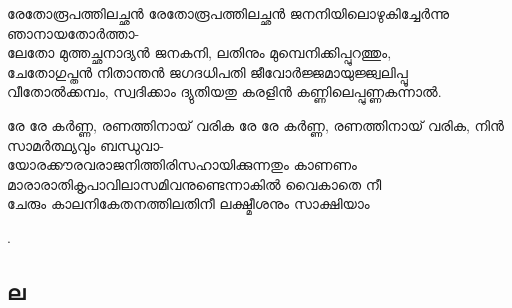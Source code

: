 \begin{enumerate}

\begin{slokam}{\VSr}{\YK}{രേതോരൂപത്തിലച്ഛൻ}
രേതോരൂപത്തിലച്ഛൻ ജനനിയിലൊഴുകിച്ചേർന്നു ഞാനായതോർത്താ-\\
ലേതോ മുത്തച്ഛനാദ്യൻ ജനകനി, ലതിനും മുമ്പെനിക്കിപ്പുറത്തും,\\
ചേതോഗുപ്തൻ നിതാന്തൻ ജഗദധിപതി ജീവോർജ്ജമായുജ്ജ്വലിപ്പൂ\\
വീതോൽക്കമ്പം, സ്വദിക്കാം ദ്യുതിയതു കരളിൻ കണ്ണിലെപ്പുണ്ണകന്നാൽ.
\end{slokam}




\begin{slokam}{\VSv}{\Naduv}{രേ രേ കർണ്ണ, രണത്തിനായ്‌ വരിക}
രേ രേ കർണ്ണ, രണത്തിനായ്‌ വരിക, നിൻ സാമർത്ഥ്യവും ബന്ധുവാ-\\
യോരക്കൗരവരാജനിത്തിരിസഹായിക്കുന്നതും കാണണം\\
മാരാരാതികൃപാവിലാസമിവനുണ്ടെന്നാകിൽ വൈകാതെ നീ\\
ചേരും കാലനികേതനത്തിലതിനീ ലക്ഷ്മീശനും സാക്ഷിയാം
\end{slokam}


.
\end{enumerate}

\subsection{ല}

